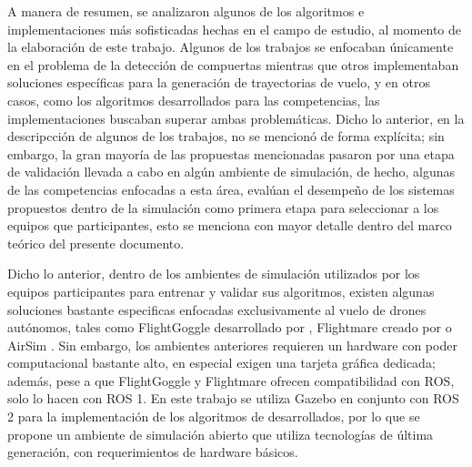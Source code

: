 A manera de resumen, se analizaron algunos de los algoritmos e implementaciones más sofisticadas hechas en el campo de estudio, al momento de la elaboración de este trabajo. Algunos de los trabajos se enfocaban únicamente en el problema de la detección de compuertas mientras que otros implementaban soluciones específicas para la generación de trayectorias de vuelo, y en otros casos, como los algoritmos desarrollados para las competencias, las implementaciones buscaban superar ambas problemáticas. Dicho lo anterior, en la descripcción de algunos de los trabajos, no se mencionó de forma explícita; sin embargo, la gran mayoría de las propuestas mencionadas pasaron por una etapa de validación llevada a cabo en algún ambiente de simulación, de hecho, algunas de las competencias enfocadas a esta área, evalúan el desempeño de los sistemas propuestos dentro de la simulación como primera etapa para seleccionar a los equipos que participantes, esto se menciona con mayor detalle dentro del marco teórico del presente documento.

Dicho lo anterior, dentro de los ambientes de simulación utilizados por los equipos participantes para entrenar y validar sus algoritmos, existen algunas soluciones bastante especificas enfocadas exclusivamente al vuelo de drones autónomos, tales como FlightGoggle desarrollado por \citet{guerra2019flightgoggles}, Flightmare creado por \citet{song2020flightmare} o AirSim \cite{airsim2017fsr}. Sin embargo, los ambientes anteriores requieren un hardware con poder computacional bastante alto, en especial exigen una tarjeta gráfica dedicada; además, pese a que FlightGoggle y Flightmare ofrecen compatibilidad con ROS, solo lo hacen con ROS 1. En este trabajo se utiliza Gazebo en conjunto con ROS 2 para la implementación de los algoritmos de desarrollados, por lo que se propone un ambiente de simulación abierto que utiliza tecnologías de última generación, con requerimientos de hardware básicos.

